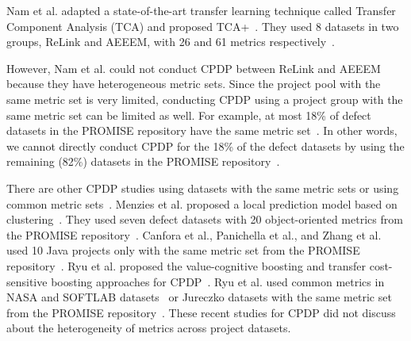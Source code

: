 Nam et al. adapted a state-of-the-art
transfer learning technique called Transfer Component Analysis (TCA) and
proposed TCA+~\cite{Nam13}. They used 8
datasets in two groups, ReLink and AEEEM, with 26 and 61 metrics
respectively~\cite{Nam13}.
%

However, Nam et al. could not conduct CPDP between ReLink and AEEEM because they
have heterogeneous metric sets.
Since the project pool with the same metric set is very limited, conducting
CPDP using a project group with the same metric set can be
limited as well. For example, at most 18\% of defect datasets in the
PROMISE repository have the same metric set~\cite{promise12}. In other words,
we cannot directly conduct CPDP for the 18\% of the defect datasets by
using the remaining (82\%) datasets in the PROMISE
repository~\cite{promise12}.


There are other CPDP studies using datasets with the same metric sets or using common metric sets~\cite{Canfora13,me12d,promise12,Panichella14,Zhang15,Ryu14,Ryu15}.
Menzies et al. proposed a local prediction model based on clustering~\cite{me12d}. They used seven defect datasets with 20 object-oriented metrics from the PROMISE repository~\cite{me12d,promise12}.
Canfora et al., Panichella et al., and Zhang et al.
used 10 Java projects only with the same metric set from the PROMISE
repository~\cite{Canfora13,promise12,Panichella14,Zhang15}.
Ryu et al. proposed the value-cognitive boosting and transfer cost-sensitive boosting approaches for CPDP~\cite{Ryu14,Ryu15}. Ryu et al. used common metrics in NASA and SOFTLAB datasets~\cite{Ryu14} or Jureczko datasets with the same metric set from the PROMISE repository~\cite{Ryu15}. These recent studies for CPDP did not discuss about the heterogeneity of metrics across project datasets.




